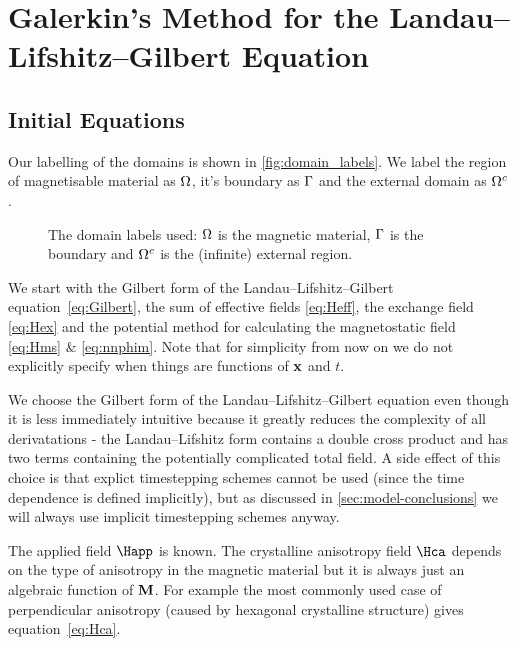 \chapter{Galerkin's Method for the Landau--Lifshitz--Gilbert Equation}
\label{sec:galerk-meth-llg}

\section{Initial Equations}
\label{sec:llg-initial-equations}

Our labelling of the domains is shown in \autoref{fig:domain_labels}. We label the region of magnetisable material as $\Omega$, it's boundary as ${\Gamma}$ and the external domain as ${\Omega^c}$.

\begin{figure}[\figpos]
  \center
  \caption{The domain labels used: $\Omega$ is the magnetic material, ${\Gamma}$ is the boundary and ${\Omega^c}$ is the (infinite) external region.} \label{fig:domain_labels}
\end{figure}

We start with the Gilbert form of the Landau--Lifshitz--Gilbert equation~\eqref{eq:Gilbert}, the sum of effective fields \eqref{eq:Heff}, the exchange field \eqref{eq:Hex} and the potential method for calculating the magnetostatic field \eqref{eq:Hms} \& \eqref{eq:nnphim}. Note that for simplicity from now on we do not explicitly specify when things are functions of $\mathbf{x}$ and $t$.

We choose the Gilbert form of the Landau--Lifshitz--Gilbert equation even though it is less immediately intuitive because it greatly reduces the complexity of all derivatations - the Landau--Lifshitz form contains a double cross product and has two terms containing the potentially complicated total field. A side effect of this choice is that explict timestepping schemes cannot be used (since the time dependence is defined implicitly), but as discussed in \autoref{sec:model-conclusions} we will always use implicit timestepping schemes anyway.

The applied field $\Happ$ is known. The crystalline anisotropy field $\Hca$ depends on the type of anisotropy in the magnetic material but it is always just an algebraic function of $\mathbf{M}$. For example the most commonly used case of perpendicular anisotropy (caused by hexagonal crystalline structure) gives equation~\eqref{eq:Hca}.

